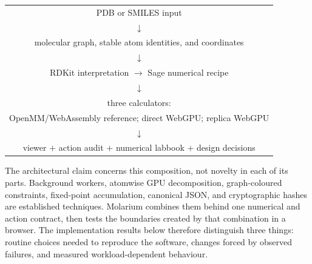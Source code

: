 \begin{center}
  \small
  \begin{tabular}{c}
    PDB or SMILES input \\
    $\downarrow$ \\
    molecular graph, stable atom identities, and coordinates \\
    $\downarrow$ \\
    RDKit interpretation $\rightarrow$ Sage numerical recipe \\
    $\downarrow$ \\
    three calculators: \\
    OpenMM/WebAssembly reference; direct WebGPU; replica WebGPU \\
    $\downarrow$ \\
    viewer $+$ action audit $+$ numerical labbook $+$ design decisions
  \end{tabular}
\end{center}

The architectural claim concerns this composition, not novelty in each of its
parts. Background workers, atomwise GPU decomposition, graph-coloured
constraints, fixed-point accumulation, canonical JSON, and cryptographic hashes
are established techniques. Molarium combines them behind one numerical and
action contract, then tests the boundaries created by that combination in a
browser. The implementation results below therefore distinguish three things:
routine choices needed to reproduce the software, changes forced by observed
failures, and measured workload-dependent behaviour.

